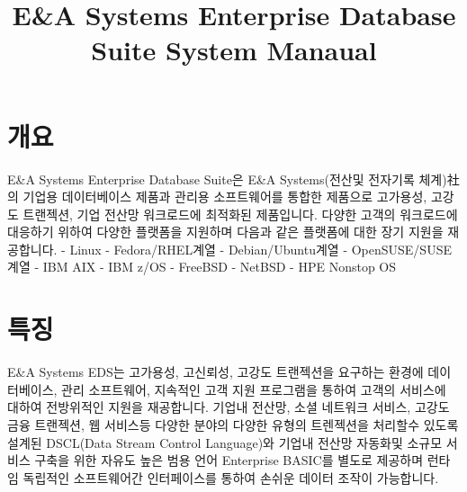 \documentclass{article}
\title{E\&A Systems Enterprise Database Suite System Manaual}
\begin{document}
\maketitle
\section{개요}
E\&A Systems Enterprise Database Suite은 E\&A Systems(전산및 전자기록 체계)社의 기업용 데이터베이스 제품과 관리용 소프트웨어를 통합한
제품으로 고가용성, 고강도 트랜젝션, 기업 전산망 워크로드에 최적화된 제품입니다. 다양한 고객의 워크로드에 대응하기 위하여 다양한 플랫폼을 지원하며 다음과 같은 플랫폼에 대한 장기 지원을 재공합니다.
\newline
- Linux
\newline
	\indent- Fedora/RHEL계열
	\newline
	\indent- Debian/Ubuntu계열
	\newline
	\indent- OpenSUSE/SUSE계열
\newline	
- IBM AIX
\newline
- IBM z/OS
\newline
- FreeBSD
\newline
- NetBSD
\newline
- HPE Nonstop OS
\newline

\section{특징}
E\&A Systems EDS는 고가용성, 고신뢰성, 고강도 트랜젝션을 요구하는 환경에 데이터베이스, 관리 소프트웨어, 지속적인 고객 지원 프로그램을 통하여 고객의 서비스에 대하여 전방위적인 지원을 재공합니다. 기업내 전산망, 소셜 네트워크 서비스, 고강도 금융 트랜젝션, 웹 서비스등 다양한 분야의 다양한 유형의 트렌젝션을 처리할수 있도록 설계된 DSCL(Data Stream Control Language)와 기업내 전산망 자동화및 소규모 서비스 구축을 위한 자유도 높은 범용 언어 Enterprise BASIC를 별도로 제공하며 런타임 독립적인 소프트웨어간 인터페이스를 통하여 손쉬운 데이터 조작이 가능합니다.
\end{document}
